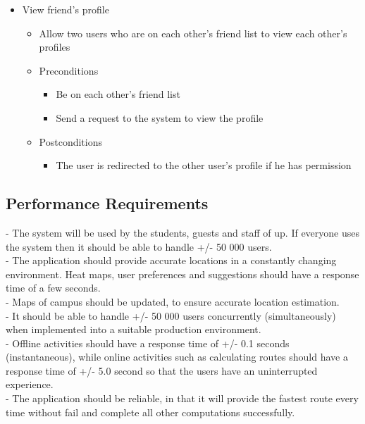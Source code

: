 \documentclass[12pt]{article}
\begin{document}
\begin{enumerate}
\begin{itemize}
				\item View friend’s profile
				\begin{itemize}
					\item Allow two users who are on each other’s friend list to view each other’s profiles
					\item Preconditions
					\begin{itemize}
						\item Be on each other’s friend list
						\item Send a request to the system to view the profile
					\end{itemize}
					\item Postconditions
					\begin{itemize}
						\item The user is redirected to the other user’s profile if he has permission
					\end{itemize}
				\end{itemize}
				
			\end{itemize}
			
		  
		\end{enumerate}
		
	\subsection{Performance Requirements}
	- The system will be used by the students, guests and staff of up. If everyone uses the system then it should be able to handle +/- 50 000 users. \\
	- The application should provide accurate locations in a constantly changing environment. Heat maps, user preferences and suggestions should have a response time of a few seconds.\\
	- Maps of campus should be updated, to ensure accurate location estimation. \\
	- It should be able to handle +/- 50 000 users concurrently (simultaneously) when implemented into a suitable production environment. \\
	- Offline activities should have a response time of +/- 0.1 seconds (instantaneous), while online activities such as calculating routes should have a response time of +/- 5.0 second so that the users have an uninterrupted experience. \\
	- The application should be reliable, in that it will provide the fastest route every time without fail and complete all other computations successfully. 
\end{document}
